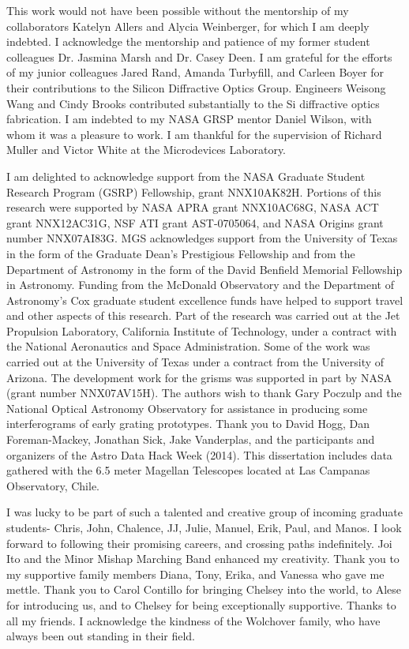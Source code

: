 \documentclass[12pt]{report}	%
\begin{document}
\begin{acknowledgments}		%
%

This work would not have been possible without the mentorship of my collaborators Katelyn Allers and Alycia Weinberger, for which I am deeply indebted.  I acknowledge the mentorship and patience of my former student colleagues Dr. Jasmina Marsh and Dr. Casey Deen.  I am grateful for the efforts of my junior colleagues Jared Rand, Amanda Turbyfill, and Carleen Boyer for their contributions to the Silicon Diffractive Optics Group.  Engineers Weisong Wang and Cindy Brooks contributed substantially to the Si diffractive optics fabrication.  I am indebted to my NASA GRSP mentor Daniel Wilson, with whom it was a pleasure to work.  I am thankful for the supervision of Richard Muller and Victor White at the Microdevices Laboratory.  

I am delighted to acknowledge support from the NASA Graduate Student Research Program (GSRP) Fellowship, grant NNX10AK82H.  Portions of this research were supported by NASA APRA grant NNX10AC68G, NASA ACT grant NNX12AC31G, NSF ATI grant AST-0705064, and NASA Origins grant number NNX07AI83G.  MGS acknowledges support from the University of Texas in the form of the Graduate Dean's Prestigious Fellowship and from the Department of Astronomy in the form of the David Benfield Memorial Fellowship in Astronomy.  Funding from the McDonald Observatory and the Department of Astronomy's Cox graduate student excellence funds have helped to support travel and other aspects of this research.  Part of the research was carried out at the Jet Propulsion Laboratory, California Institute of Technology, under a contract with the National Aeronautics and Space Administration.  Some of the work was carried out at the University of Texas under a contract from the University of Arizona.  The development work for the grisms was supported in part by NASA (grant number NNX07AV15H).  The authors wish to thank Gary Poczulp and the National Optical Astronomy Observatory for assistance in producing some interferograms of early grating prototypes.  Thank you to David Hogg, Dan Foreman-Mackey, Jonathan Sick, Jake Vanderplas, and the participants and organizers of the Astro Data Hack Week (2014).  This dissertation includes data gathered with the 6.5 meter Magellan Telescopes located at Las Campanas Observatory, Chile.

I was lucky to be part of such a talented and creative group of incoming graduate students- Chris, John, Chalence, JJ, Julie, Manuel, Erik, Paul, and Manos.  I look forward to following their promising careers, and crossing paths indefinitely.  Joi Ito and the Minor Mishap Marching Band enhanced my creativity.  Thank you to my supportive family members Diana, Tony, Erika, and Vanessa who gave me mettle.  Thank you to Carol Contillo for bringing Chelsey into the world, to Alese for introducing us, and to Chelsey for being exceptionally supportive.  Thanks to all my friends.  I acknowledge the kindness of the Wolchover family, who have always been out standing in their field.


\end{acknowledgments}
\end{document}
